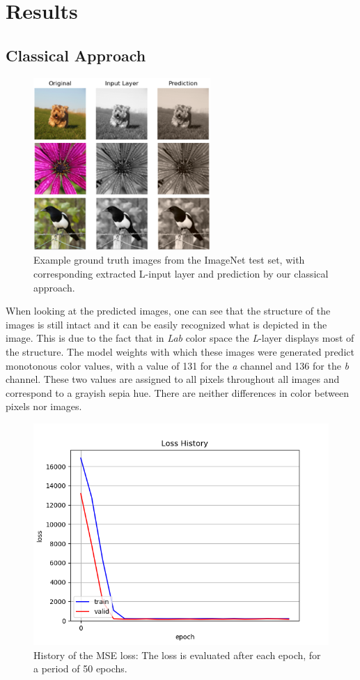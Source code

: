 \documentclass[12pt,letterpaper]{article}
\begin{document}
\section{Results}
\subsection{Classical Approach}
\begin{figure}[hbt]
	\centering
	\includegraphics[width=0.6\textwidth]{class_predict.png}
	\caption{Example ground truth images from the ImageNet test set, with corresponding extracted L-input layer and prediction by our classical approach.}
	\label{classical}
\end{figure}
When looking at the predicted images, one can see that the structure of the images is still intact and it can be easily recognized what is depicted in the image. This is due to the fact that in \emph{Lab} color space the \emph{L}-layer displays most of the structure. The model weights with which these images were generated predict monotonous color values, with a value of 131 for the \emph{a} channel and 136 for the \emph{b} channel. These two values are assigned to all pixels throughout all images and correspond to a grayish sepia hue. There are neither differences in color between pixels nor images.
\begin{figure}
	\centering
	\includegraphics[width=.65\textwidth]{loss_classical.png}
	\caption{History of the MSE loss: The loss is evaluated after each epoch, for a period of 50 epochs.}
	\label{loss_class}
\end{figure}
\end{document}
